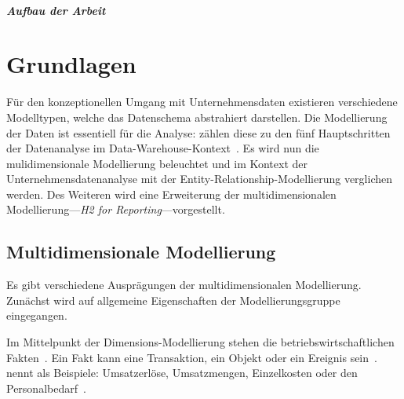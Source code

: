 \documentclass[
  language=german, %
  type=bachelor%
]{isthesis}
\begin{document}
\begin{content}
  \paragraph{Aufbau der Arbeit}




  \chapter{Grundlagen}
  


  Für den konzeptionellen Umgang mit Unternehmensdaten existieren verschiedene
  Modelltypen, welche das Datenschema abstrahiert darstellen.
  Die Modellierung der Daten ist essentiell für die Analyse:
  \textsc{\citeauthor{phipps2002automating}} zählen diese
  zu den fünf Hauptschritten der Datenanalyse im
  Data-Warehouse-Kontext~\cite[][S. 1]{phipps2002automating}. Es wird nun
  die mulidimensionale Modellierung beleuchtet und im Kontext der Unternehmensdatenanalyse
  mit der Entity-Relationship-Modellierung verglichen werden. Des Weiteren wird
  eine Erweiterung der multidimensionalen Modellierung---\textit{H2 for
  Reporting}---vorgestellt.



  \section{Multidimensionale Modellierung}
  Es gibt verschiedene Ausprägungen der multidimensionalen Modellierung.
  Zunächst wird auf allgemeine Eigenschaften der Modellierungsgruppe eingegangen.

  Im Mittelpunkt der Dimensions-Modellierung stehen die
  betriebswirtschaftlichen Fakten~\cite[][S.  2]{phipps2002automating}. Ein
  Fakt kann eine Transaktion, ein Objekt oder ein Ereignis sein~\cite[][S.
  42]{ballard1998data}. \textsc{\citeauthor{Kemper2010}} nennt als Beispiele:
  \glqq{}Umsatzerlöse, Umsatzmengen, Einzelkosten oder den
  Personalbedarf\grqq{}~\cite[][S. 66]{Kemper2010}. 
  

\end{content}
\end{document}

